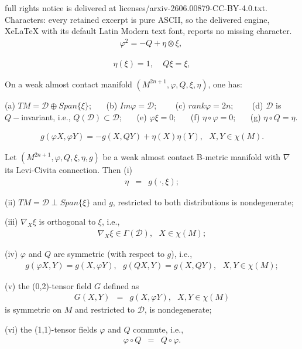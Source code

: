 \documentclass[10pt,a4paper]{amsart}
\begin{document}
full rights notice is delivered at licenses/arxiv-2606.00879-CC-BY-4.0.txt. Characters: every retained excerpt is pure ASCII, so the delivered engine, XeLaTeX with its default Latin Modern text font, reports no missing character.
	\begin{eqnarray}
		\varphi^2=-Q+\eta\otimes \xi, \ \label{eq1}
	\end{eqnarray}

	\begin{eqnarray}
		\eta(\xi)=1, \ \ \ \ \ Q\xi=\xi,   \label{eq1a}
	\end{eqnarray}

\begin{proposition} \label{p1}
On a weak almost contact manifold $(M^{2n+1},\varphi,Q,\xi,\eta)$, one has:\medskip

\noindent (a) $TM=\mathcal{D}\oplus Span\{\xi\}$; \ \ \ (b) $Im\varphi=\mathcal{D}$; \ \ \ \ (c) $rank \varphi=2n$; \ \ \ \ (d) $\mathcal{D}$ is $Q-$invariant, i.e., $Q(\mathcal{D})\subset\mathcal{D}$;      \ \ \ (e) $\varphi\xi=0$;   \ \ \  (f) $\eta\circ\varphi=0$;  \ \ \ (g) $\eta\circ Q=\eta$. 
\end{proposition}

	\begin{eqnarray}
		g(\varphi X,\varphi Y)=-g(X,QY)+\eta(X)\eta(Y), \ \ \ X,Y\in\chi(M).  \label{eq4}
	\end{eqnarray}

\begin{proposition} \label{p2} Let $(M^{2n+1},\varphi,Q,\xi,\eta,g)$ be a weak almost contact B-metric manifold with $\nabla$ its Levi-Civita connection. Then (i)	
		\begin{eqnarray}
		\eta &=& g(\cdot,\xi); \label{e5}
	\end{eqnarray}

\noindent (ii) $TM=\mathcal{D}\perp Span\{\xi\}$ and $g$, restricted to  both distributions is nondegenerate;\medskip

\noindent (iii)  $\nabla_X\xi$ is orthogonal to $\xi$, i.e., 
\begin{eqnarray}
	\nabla_X\xi\in\Gamma(\mathcal{D}), \ \ \ X\in\chi(M);  \label{m2}
\end{eqnarray}
	
\noindent	(iv) $\varphi$ and $Q$ are symmetric (with respect to $g$), i.e., 
	\begin{eqnarray}
		g(\varphi X,Y) = g(X,\varphi Y), \ \ \ 
			g(QX,Y) = g(X,Q Y), \ \ \ X,Y\in\chi(M); \label{eq101}
	\end{eqnarray}

\noindent (v) the (0,2)-tensor field $G$ defined as 
\begin{eqnarray}
	G(X,Y)&=&g(X,\varphi Y), \ \ \ X,Y\in\chi(M)    \label{e3}
\end{eqnarray}
is symmetric on $M$ and restricted to $\mathcal{D}$, is nondegenerate; \medskip

\noindent (vi) the (1,1)-tensor fields $\varphi$ and $Q$ commute, i.e.,
\begin{eqnarray}
	\varphi\circ Q &=& Q\circ\varphi. \label{eq9}
\end{eqnarray}
\end{proposition}
\end{document}
